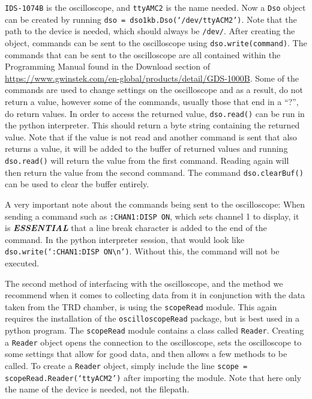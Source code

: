\documentclass[11pt]{article}
\numberwithin{equation}{section}
\numberwithin{figure}{section}
\numberwithin{table}{section}
\begin{document}
\texttt{IDS-1074B} is the oscilloscope, and \texttt{ttyAMC2} is the name needed. Now a \texttt{Dso} object can be created by running \texttt{dso = dso1kb.Dso(`/dev/ttyACM2')}. Note that the path to the device is needed, which should always be \texttt{/dev/}. After creating the object, commands can be sent to the oscilloscope using \texttt{dso.write(command)}. The commands that can be sent to the oscilloscope are all contained within the Programming Manual found in the Download section of \url{https://www.gwinstek.com/en-global/products/detail/GDS-1000B}. Some of the commands are used to change settings on the oscilloscope and as a result, do not return a value, however some of the commands, usually those that end in a ``?'', do return values. In order to access the returned value, \texttt{dso.read()} can be run in the python interpreter. This should return a byte string containing the returned value. Note that if the value is not read and another command is sent that also returns a value, it will be added to the buffer of returned values and running \texttt{dso.read()} will return the value from the first command. Reading again will then return the value from the second command. The command \texttt{dso.clearBuf()} can be used to clear the buffer entirely. 
\par A very important note about the commands being sent to the oscilloscope: When sending a command such as \texttt{:CHAN1:DISP ON}, which sets channel 1 to display, it is \textit{\textbf{ESSENTIAL}} that a line break character is added to the end of the command. In the python interpreter session, that would look like \texttt{dso.write(`:CHAN1:DISP ON\textbackslash n')}. Without this, the command will not be executed. 
\newline
\par The second method of interfacing with the oscilloscope, and the method we recommend when it comes to collecting data from it in conjunction with the data taken from the TRD chamber, is using the \texttt{scopeRead} module. This again requires the installation of the \texttt{oscilloscopeRead} package, but is best used in a python program. The \texttt{scopeRead} module contains a class called \texttt{Reader}. Creating a \texttt{Reader} object opens the connection to the oscilloscope, sets the oscilloscope to some settings that allow for good data, and then allows a few methods to be called. To create a \texttt{Reader} object, simply include the line \texttt{scope = scopeRead.Reader(`ttyACM2')} after importing the module. Note that here only the name of the device is needed, not the filepath. 
\end{document}
